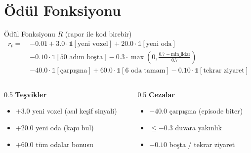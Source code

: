 \documentclass[aspectratio=169,11pt]{beamer}
\begin{document}
\section{Ödül Fonksiyonu}
\begin{frame}{Ödül Fonksiyonu $R$ \small (rapor ile kod birebir)}
  \small
  \begin{align*}
  r_t = \;& -0.01
          + 3.0\cdot\mathbb{1}[\text{yeni voxel}]
          + 20.0\cdot\mathbb{1}[\text{yeni oda}] \\
        & - 0.10\cdot\mathbb{1}[\text{50 adım boşta}]
          - 0.3\cdot\max\!\left(0, \tfrac{0.7-\text{min\_lidar}}{0.7}\right) \\
        & - 40.0\cdot\mathbb{1}[\text{çarpışma}]
          + 60.0\cdot\mathbb{1}[\text{6 oda tamam}]
          - 0.10\cdot\mathbb{1}[\text{tekrar ziyaret}]
  \end{align*}
  \vfill
  \begin{columns}[T]
    \begin{column}{0.5\textwidth}
      \footnotesize
      \textbf{Teşvikler}
      \begin{itemize}
        \item \textcolor{green!50!black}{$+3.0$} yeni voxel (asıl keşif sinyali)
        \item \textcolor{green!50!black}{$+20.0$} yeni oda (kapı bul)
        \item \textcolor{green!50!black}{$+60.0$} tüm odalar bonusu
      \end{itemize}
    \end{column}
    \begin{column}{0.5\textwidth}
      \footnotesize
      \textbf{Cezalar}
      \begin{itemize}
        \item \textcolor{red!70!black}{$-40.0$} çarpışma (episode biter)
        \item \textcolor{red!70!black}{$\le -0.3$} duvara yakınlık
        \item \textcolor{red!70!black}{$-0.10$} boşta / tekrar ziyaret
      \end{itemize}
    \end{column}
  \end{columns}
\end{frame}
\end{document}
